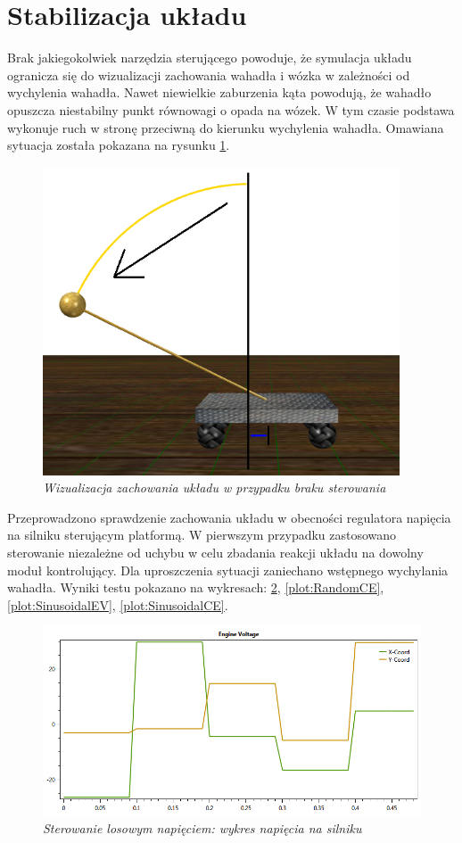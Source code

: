\documentclass[12pt, oneside]{report}
\theoremstyle{definition}
\begin{document}
\section{Stabilizacja układu}
Brak jakiegokolwiek narzędzia sterującego powoduje, że symulacja układu ogranicza się do wizualizacji zachowania wahadła i wózka w zależności od wychylenia wahadła. Nawet niewielkie zaburzenia kąta powodują, że wahadło opuszcza niestabilny punkt równowagi o opada na wózek. W tym czasie podstawa wykonuje ruch w stronę przeciwną do kierunku wychylenia wahadła. Omawiana sytuacja została pokazana na rysunku \ref{figure:ModelWithoutControl}.

\begin{figure}[H]
	\centering
		\includegraphics[width = 300pt]{ModelWithoutControl} 
		\caption{\textit{Wizualizacja zachowania układu w przypadku braku sterowania}}
		\label{figure:ModelWithoutControl}
\end{figure}

Przeprowadzono sprawdzenie zachowania układu w obecności regulatora napięcia na silniku sterującym platformą. W pierwszym przypadku zastosowano sterowanie niezależne od uchybu w celu zbadania reakcji układu na dowolny moduł kontrolujący. Dla uproszczenia sytuacji zaniechano wstępnego wychylania wahadła. Wyniki testu pokazano na wykresach: \ref{plot:RandomEV}, \ref{plot:RandomCE}, \ref{plot:SinusoidalEV}, \ref{plot:SinusoidalCE}.

\begin{figure}[H]
	\centering
		\includegraphics[width = 350pt]{RandomEV} 
		\caption{\textit{Sterowanie losowym napięciem: wykres napięcia na silniku}}
		\label{plot:RandomEV}
\end{figure}
\end{document}

